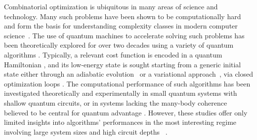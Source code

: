 \documentclass[twocolumn,amssymb,secnumarabic, prl, aps, nofootinbib]{revtex4-1}
\begin{document}
\maketitle 



\date{}

Combinatorial optimization is ubiquitous in many areas of science and technology. Many such problems have been shown to be computationally hard and form the basis for understanding complexity classes in modern computer science~\cite{sipser13}. The use of quantum machines to accelerate solving such problems has been theoretically explored for over two decades using a variety of quantum algorithms  \cite{farhi_quantum_2000,farhi_quantum_2014, lidar_albash_review_2018}. Typically, a relevant cost function is encoded in a quantum Hamiltonian \cite{Lucas_Ising_Formulation}, and its low-energy state is sought starting from a generic initial state either through an adiabatic evolution~\cite{farhi_quantum_2000} or a variational approach~\cite{farhi_quantum_2014}, via closed optimization loops \cite{Wecker_Training_Optimizer, Kokail2019}. The computational performance of such algorithms has been investigated theoretically \cite{Barahona_complexity_spin_glass, lidar_albash_review_2018,
	bapst_2012,Farhi_NP_complete, farhi_random_regular_2012, knysh_2016, young_2010} and experimentally \cite{harrigan_quantum_2021, pagano_quantum_2020, graham2022demonstration} in small quantum systems with shallow quantum circuits, or in systems lacking the many-body coherence believed to be central for quantum  advantage \cite{Lidar_Martinis_Speedup, Speedup_Spin_Glass_DWave}. However, 
these studies %
offer only limited insights into algorithms' performances in the most interesting regime involving large system sizes and high circuit depths ~\cite{farhi_2020_quantum, chou_overlap_gap_2021}.
\end{document}
